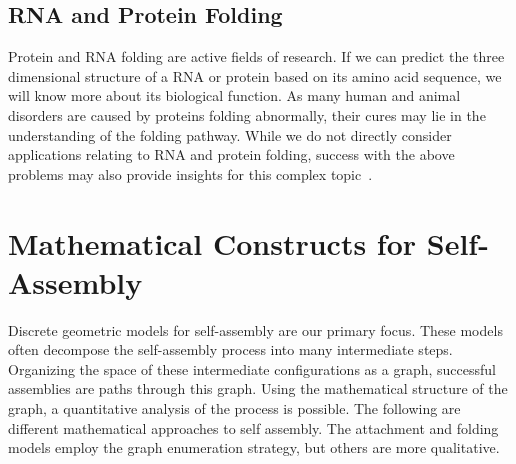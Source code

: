 \subsection{RNA and Protein Folding}

Protein and RNA folding are active fields of research. If we can predict the three dimensional structure of a RNA or protein based on its amino acid sequence, we will know more about its biological function. As many human and animal disorders are caused by proteins folding abnormally, their cures may lie in the understanding of the folding pathway. While we do not directly consider applications relating to RNA and protein folding, success with the above problems may also provide insights for this complex topic~\cite{Lindorff-Larsen2011}.


\section{Mathematical Constructs for Self-Assembly}

Discrete geometric models for self-assembly are our primary focus. These models often decompose the self-assembly process into many intermediate steps. Organizing the space of these intermediate configurations as a graph, successful assemblies are paths through this graph. Using the mathematical structure of the graph, a quantitative analysis of the process is possible. The following are different mathematical approaches to self assembly. The attachment and folding models employ the graph enumeration strategy, but others are more qualitative. 







